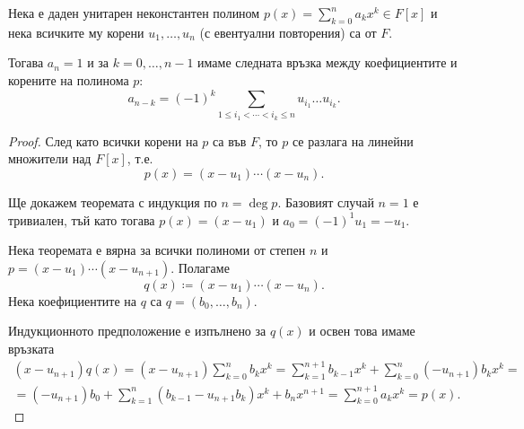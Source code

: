 \documentclass[numbers=endperiod, DIV=15]{scrartcl}
\begin{document}
\begin{theorem}
  Нека е даден унитарен неконстантен полином $p(x) = \sum_{k=0}^n a_k x^k \in F[x]$ и нека всичките му корени $u_1, \ldots, u_n$ (с евентуални повторения) са от $F$.

  Тогава $a_n = 1$ и за $k = 0, \ldots, n-1$ имаме следната връзка между коефициентите и корените на полинома $p$:
  \begin{displaymath}
    a_{n-k} = {(-1)}^k \sum_{1 \leq i_1 < \cdots < i_k \leq n} u_{i_1} \ldots u_{i_k}.
  \end{displaymath}
\end{theorem}
\begin{proof}
  След като всички корени на $p$ са във $F$, то $p$ се разлага на линейни множители над $F[x]$, т.е.
  \begin{displaymath}
    p(x) = (x - u_1) \cdots (x - u_n).
  \end{displaymath}

  Ще докажем теоремата с индукция по $n = \deg p$. Базовият случай $n = 1$ е тривиален, тъй като тогава $p(x) = (x - u_1)$ и $a_0 = {(-1)}^1 u_1 = -u_1$.

  Нека теоремата е вярна за всички полиноми от степен $n$ и $p = (x - u_1) \cdots (x - u_{n+1})$. Полагаме
  \begin{displaymath}
    q(x) \coloneqq (x - u_1) \cdots (x - u_n).
  \end{displaymath}
  Нека коефициентите на $q$ са $q = (b_0, \ldots, b_n)$.

  Индукционното предположение е изпълнено за $q(x)$ и освен това имаме връзката
  \begin{multline*}
    (x - u_{n+1}) q(x)
    =
    (x - u_{n+1}) \sum_{k=0}^n b_k x^k
    =
    \sum_{k=1}^{n+1} b_{k-1} x^k + \sum_{k=0}^n (-u_{n+1}) b_k x^k
    = \\ =
    (-u_{n+1}) b_0 + \sum_{k=1}^n (b_{k-1} - u_{n+1} b_k) x^k + b_n x^{n+1}
    =
    \sum_{k=0}^{n+1} a_k x^k
    =
    p(x).
  \end{multline*}


\end{proof}
\end{document}
